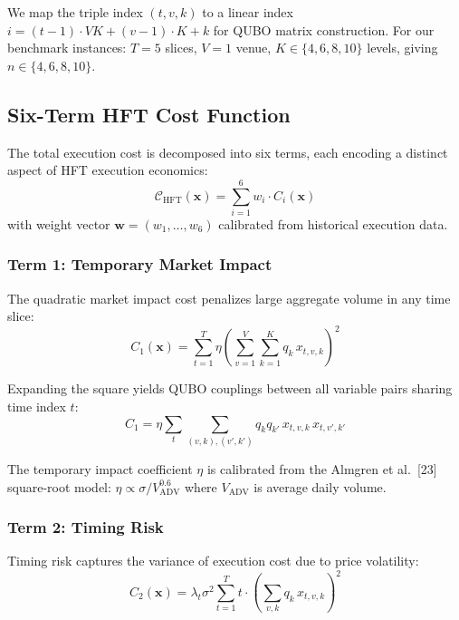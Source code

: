 \documentclass[11pt]{article}
\newcommand{\bx}{\mathbf{x}}
\begin{document}
We map the triple index $(t,v,k)$ to a linear index $i = (t-1) \cdot VK + (v-1) \cdot K + k$ for QUBO matrix construction. For our benchmark instances: $T = 5$ slices, $V = 1$ venue, $K \in \{4, 6, 8, 10\}$ levels, giving $n \in \{4, 6, 8, 10\}$.

\subsection{Six-Term HFT Cost Function}

The total execution cost is decomposed into six terms, each encoding a distinct aspect of HFT execution economics:
\begin{equation}
\mathcal{C}_{\mathrm{HFT}}(\bx) = \sum_{i=1}^{6} w_i \cdot C_i(\bx)
\label{eq:total_cost}
\end{equation}
with weight vector $\mathbf{w} = (w_1, \ldots, w_6)$ calibrated from historical execution data.

\subsubsection{Term 1: Temporary Market Impact}

The quadratic market impact cost penalizes large aggregate volume in any time slice:
\begin{equation}
C_1(\bx) = \sum_{t=1}^{T} \eta \left(\sum_{v=1}^V \sum_{k=1}^K q_k \, x_{t,v,k}\right)^2
\label{eq:C1}
\end{equation}

Expanding the square yields QUBO couplings between all variable pairs sharing time index $t$:
\begin{equation}
C_1 = \eta \sum_t \sum_{(v,k),(v',k')} q_k q_{k'} \, x_{t,v,k} \, x_{t,v',k'}
\end{equation}

The temporary impact coefficient $\eta$ is calibrated from the Almgren et al.\ [23] square-root model: $\eta \propto \sigma / V_{\mathrm{ADV}}^{0.6}$ where $V_{\mathrm{ADV}}$ is average daily volume.

\subsubsection{Term 2: Timing Risk}

Timing risk captures the variance of execution cost due to price volatility:
\begin{equation}
C_2(\bx) = \lambda_t \sigma^2 \sum_{t=1}^{T} t \cdot \left(\sum_{v,k} q_k \, x_{t,v,k}\right)^2
\label{eq:C2}
\end{equation}
\end{document}
